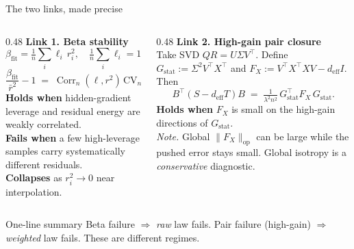 \documentclass[10pt,aspectratio=169]{beamer}
\newcommand{\hl}[1]{{\color{nicered}\textbf{#1}}}
\newcommand{\good}[1]{{\color{nicegreen}\textbf{#1}}}
\newcommand{\T}{^{\!\top}}
\newcommand{\op}{\mathrm{op}}
\DeclareMathOperator{\Corr}{Corr}
\begin{document}
\begin{frame}{The two links, made precise}
  \footnotesize
  \begin{columns}[T,onlytextwidth]
    \begin{column}{0.48\textwidth}
      \textbf{Link 1. Beta stability}
      \[ \beta_{\mathrm{fit}} = \tfrac{1}{n}\sum_i \ell_i\, r_i^2, \quad \tfrac{1}{n}\sum_i \ell_i = 1. \]
      \[ \frac{\beta_{\mathrm{fit}}}{\bar r^2} - 1 \;=\; \Corr_n(\ell, r^2)\,\mathrm{CV}_n(\ell)\,\mathrm{CV}_n(r^2). \]
      \good{Holds when} hidden-gradient leverage and residual energy are weakly correlated.\\[2pt]
      \hl{Fails when} a few high-leverage samples carry systematically different residuals.\\[2pt]
      \hl{Collapses} as $r_i^2 \to 0$ near interpolation.
      \vfill\null
    \end{column}
    \begin{column}{0.48\textwidth}
      \textbf{Link 2. High-gain pair closure}\\[2pt]
      Take SVD $QR = U\Sigma V\T$. Define $G_{\mathrm{stat}} := \Sigma^2 V\T X\T$ and $F_X := V\T X\T X V - d_{\mathrm{eff}} I$. Then
      \[ B\T(S - d_{\mathrm{eff}} T) B \;=\; \tfrac{1}{\lambda^2 n^2}\, G_{\mathrm{stat}}\T F_X\, G_{\mathrm{stat}}. \]
      \good{Holds when} $F_X$ is small on the high-gain directions of $G_{\mathrm{stat}}$.\\[2pt]
      \emph{Note.} Global $\|F_X\|_\op$ can be large while the pushed error stays small. Global isotropy is a \emph{conservative} diagnostic.
      \vfill\null
    \end{column}
  \end{columns}
  \vspace{8pt}
  \begin{ibox}{One-line summary}
    Beta failure $\Rightarrow$ \emph{raw} law fails. \quad Pair failure (high-gain) $\Rightarrow$ \emph{weighted} law fails. These are different regimes.
  \end{ibox}
\end{frame}
\end{document}

